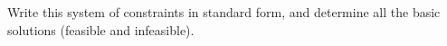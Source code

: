 Write this system of constraints in standard form, and determine all the basic solutions (feasible and infeasible).

\begin{solution}
  \ \\
\end{solution}